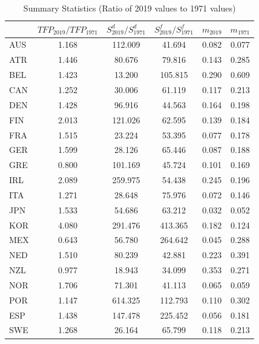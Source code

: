 \documentclass[12pt]{article}
\begin{document}
\begin{table}[ht!]
\centering
\onehalfspacing
{}
\caption{Summary Statistics (Ratio of 2019 values to 1971 values)}
\begin{tabular*}{\textwidth}{@{\extracolsep{\fill}} l c c c c c}
\hline
 & $TFP_{2019}/TFP_{1971}$ & $S^d_{2019}/S^d_{1971}$ & $S^f_{2019}/S^f_{1971}$ & $m_{2019}$ & $m_{1971}$ \\
\hline
AUS   & 1.168    & 112.009   & 41.694    & 0.082     & 0.077    \\
ATR     & 1.446    & 80.676    & 79.816    & 0.143     & 0.285    \\
BEL     & 1.423    & 13.200    & 105.815   & 0.290     & 0.609    \\
CAN      & 1.252    & 30.006    & 61.119    & 0.117     & 0.213    \\
DEN     & 1.428    & 96.916    & 44.563    & 0.164     & 0.198    \\
FIN     & 2.013    & 121.026   & 62.595    & 0.139     & 0.184    \\
FRA      & 1.515    & 23.224    & 53.395    & 0.077     & 0.178    \\
GER     & 1.599    & 28.126    & 65.446    & 0.087     & 0.188    \\
GRE      & 0.800    & 101.169   & 45.724    & 0.101     & 0.169    \\
IRL     & 2.089    & 259.975   & 54.438    & 0.245     & 0.196    \\
ITA       & 1.271    & 28.648    & 75.976    & 0.072     & 0.146    \\
JPN       & 1.533    & 54.686    & 63.212    & 0.032     & 0.052    \\
KOR       & 4.080    & 291.476   & 413.365   & 0.182     & 0.124    \\
MEX      & 0.643    & 56.780    & 264.642   & 0.045     & 0.288    \\
NED & 1.510    & 80.239    & 42.881    & 0.223     & 0.391    \\
NZL & 0.977    & 18.943    & 34.099    & 0.353     & 0.271    \\
NOR      & 1.706    & 71.301    & 41.113    & 0.065     & 0.059    \\
POR    & 1.147   & 614.325   & 112.793   & 0.110     & 0.302    \\
ESP       & 1.438    & 147.478   & 225.452   & 0.056     & 0.181    \\
SWE      & 1.268    & 26.164    & 65.799    & 0.118     & 0.213    \\

\end{tabular*}
\end{table}
\end{document}
